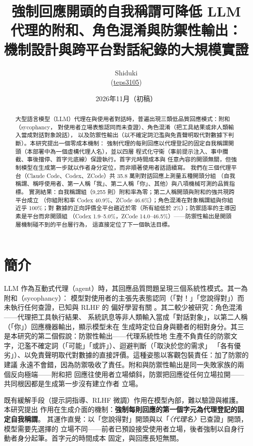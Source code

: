 \documentclass[10pt,twocolumn]{article}
\title{強制回應開頭的自我稱謂可降低 LLM 代理的附和、角色混淆與防禦性輸出：\\機制設計與跨平台對話紀錄的大規模實證}
\author{Shiduki\\ (\href{https://github.com/teps3105}{teps3105})}
\date{2026年11月（初稿）}
\begin{document}
\maketitle

\begin{abstract}
大型語言模型（LLM）代理在與使用者對話時，普遍出現三類低品質回應模式：附和（sycophancy，
對使用者立場表態認同而未查證）、角色混淆（把工具結果或非人類輸入當成對話對象說話），
以及防禦性輸出（以不確定詞氾濫與免責聲明取代對數據下判斷）。本研究提出一個零成本機制：
強制代理的每則回應以代理登記的固定自我稱謂開頭（本部署中為一個虛構代理人名），並以四層
程式化守衛（事前提示注入、事中攔截、事後擋停、首字元底線）保證執行。首字元時間成本與
任意內容的開頭無關，但強制模型在生成第一步就以作者身分定位，而非順著使用者話語續寫。
我們在三個代理平台（Claude Code、Codex、ZCode）共 35.8 萬則對話回應上測量五種開頭分組
（自我稱謂、稱呼使用者、第一人稱「我」、第二人稱「你」、其他）與八項機械可測的品質指標。
實測結果：自我稱謂組（9{,}255 則）附和率為零；第二人稱開頭與附和的強共現跨平台成立
（你組附和率 Codex 40.9\%、ZCode 46.6\%）；角色混淆在對象稱謂組與你組近乎 100\%；對
數據的正向評價全平台趨近於零（所有組低於 2\%）；防禦語率的主導因素是平台而非開頭組
（Codex 1.9--5.0\%，ZCode 14.0--46.5\%）——防禦性輸出是開頭層機制碰不到的平台層行為，
這直接定位了下一個執法目標。
\end{abstract}

\section{簡介}
LLM 作為互動式代理（agent）時，其回應品質問題呈現三個系統性模式。其一為附和（sycophancy）：
模型對使用者的主張先表態認同（「對！」「您說得對」）而未執行任何查證，已知與 RLHF 的
偏好學習有關 \cite{sharma2024towards}。其二較少被研究：角色混淆——代理把工具執行結果、
系統訊息等非人類輸入當成「對話對象」，以第二人稱（「你」）回應機器輸出，顯示模型未在
生成時定位自身與聽者的相對身分。其三是本研究的第二個假說：防禦性輸出——代理系統性地
生產不負責任的防禦文字，氾濫不確定詞（「可能」「或許」）、迴避判斷（「取決於您的需求」
「各有優劣」）、以免責聲明取代對數據的直接評價。這種姿態以客觀包裝責任：加了防禦的建議
永遠不會錯，因為防禦吸收了責任。附和與防禦性輸出是同一失敗家族的兩個反向極端——附和把
回應往使用者立場傾斜，防禦把回應從任何立場拉開——共同根因都是生成第一步沒有建立作者
立場。

既有緩解手段（提示詞指導、RLHF 微調）作用在模型內部，難以驗證與維護。本研究提出
作用在生成介面的機制：\textbf{強制每則回應的第一個字元為代理登記的固定自我稱謂}。
其運作直覺：以「您說得對」開頭與以「\textit{〈代理名〉}已查證」開頭，模型需要先選擇的
立場不同——前者已預設接受使用者立場，後者強制以自身行動者身分起筆。首字元的時間成本
固定，與回應長短無關。
\end{document}

